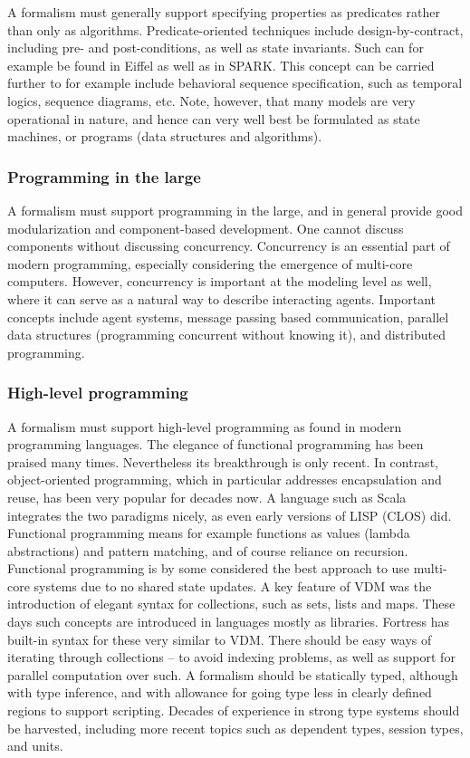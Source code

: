 A formalism must generally support specifying properties as 
predicates rather than only as algorithms. Predicate-oriented techniques 
include design-by-contract, including pre- and post-conditions, as 
well as state invariants. Such can for example be found in Eiffel 
as  well as in SPARK. This concept can be carried 
further to for example include behavioral sequence specification, 
such as temporal logics, sequence diagrams, etc.
Note, however, that many models are very operational in
nature, and hence can very well best be formulated as state 
machines, or programs (data structures and algorithms). 

\subsubsection{Programming in the large}

A formalism must support programming in the large, and in general
provide good modularization and component-based development. One cannot discuss components without discussing concurrency. Concurrency is an essential part of modern programming, especially 
considering the emergence of multi-core computers. However, 
concurrency is important at the modeling level as well, where it 
can serve as a natural way to describe interacting agents. 
Important concepts include agent systems, message passing based 
communication, parallel data structures (programming concurrent 
without knowing it), and distributed programming.

\subsubsection{High-level programming}

A formalism must support high-level programming as found in modern
programming languages. The elegance  of functional programming has 
been praised many times. Nevertheless its breakthrough is only 
recent. In contrast, object-oriented programming, 
which in particular addresses encapsulation and reuse, has been very 
popular for decades now. A language such as Scala 
integrates the two paradigms nicely, as even early versions 
of LISP (CLOS) did. 
Functional programming means for example functions as 
values (lambda abstractions) and pattern matching, and of course 
reliance on recursion. Functional programming is by some considered 
the best approach to use multi-core systems due to no shared state 
updates. A key feature of VDM was the introduction of elegant syntax for collections, such as sets, lists and maps. These days such concepts are introduced in languages mostly as libraries. Fortress has built-in syntax for these very similar to VDM.
There should be easy ways of iterating through collections – to avoid indexing problems, as well as support for parallel computation over such.
A formalism should be statically typed, although with type inference, and with allowance for going type less
in clearly defined regions to support scripting. 
Decades of experience in strong type systems should be harvested, including more recent  topics such as dependent types, session types, and units.

